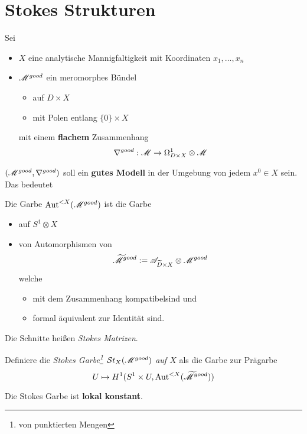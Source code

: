 
\begin{lem}
  \TODO
\end{lem}
\begin{thm}
  \TODO
\end{thm}
\section{Stokes Strukturen} %
Sei
\begin{itemize}
  \item $X$ eine analytische Mannigfaltigkeit mit Koordinaten $x_1,\dots,x_n$
  \item $\mathscr{M}^{good}$ ein meromorphes Bündel
    \begin{itemize}
      \item auf $D\times X$
      \item mit Polen entlang $\{0\}\times X$
    \end{itemize}
    mit einem \textbf{flachem} Zusammenhang
    \[
      \nabla^{good}:\mathscr{M}\to\Omega_{D\times X}^1\otimes \mathscr{M}
    \]
\end{itemize}
$(\mathscr{M}^{good},\nabla^{good})$ soll ein \textbf{gutes Modell} in der Umgebung von
jedem $x^0\in X$ sein. Das bedeutet \TODO


\begin{defn}
  Die Garbe $\operatorname{Aut}^{<X}(\mathscr{M}^{good})$ ist die Garbe
  \begin{itemize}
    \item auf $S^1\otimes X$
    \item von Automorphismen von
      \[
        \widetilde{\mathscr{M}}^{good}:=\mathscr{A}_{\widetilde D\times X}\otimes\mathscr{M}^{good}
      \]
      welche
      \begin{itemize}
        \item mit dem Zusammenhang kompatibel\TODO[in Formeln] sind und
        \item formal äquivalent zur Identität sind.
      \end{itemize}
  \end{itemize}
  Die Schnitte heißen \emph{Stokes Matrizen}.
\end{defn}
\begin{defn}
  Definiere die \emph{Stokes Garbe\footnote{von punktierten Mengen}
  $\mathcal{S}{}t_X(\mathscr{M}^{good})$ auf $X$} als die Garbe zur Prägarbe
  \[
    U\mapsto H^1(S^1\times U,\operatorname{Aut}^{<X}(\widetilde {\mathscr{M}}^{good}))
  \]
  \begin{thm}
    Die Stokes Garbe ist \textbf{lokal konstant}.
  \end{thm}
\end{defn}

